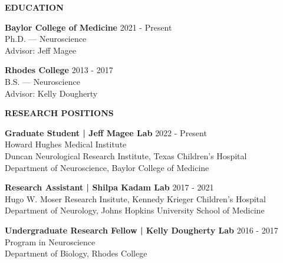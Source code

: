 \documentclass{resume} %
\begin{document}
\begin{rSection}{{\bfseries EDUCATION}}
 
    {\bfseries Baylor College of Medicine} \hfill { 2021 - Present }
    \\ Ph.D. — Neuroscience
    \\ Advisor: Jeff Magee \vspace{0.3\baselineskip}
    
    {\bfseries Rhodes College} \hfill { 2013 - 2017  }
    \\ B.S. — Neuroscience
    \\ Advisor: Kelly Dougherty 
    \end{rSection}


\begin{rSection}{{\bfseries RESEARCH POSITIONS}}
    
    {\bfseries Graduate Student | Jeff Magee Lab} \hfill {2022 - Present}
    \\ Howard Hughes Medical Institute
    \\ Duncan Neurological Research Institute, Texas Children's Hospital 
    \\ Department of Neuroscience, Baylor College of Medicine \vspace{0.3\baselineskip}

    {\bfseries Research Assistant | Shilpa Kadam Lab} \hfill {2017 - 2021} 
    \\ Hugo W. Moser Research Insitute, Kennedy Krieger Children's Hospital
    \\ Department of Neurology, Johns Hopkins University School of Medicine \vspace{0.3\baselineskip}

    {\bfseries Undergraduate Research Fellow | Kelly Dougherty Lab} \hfill {2016 - 2017} 
    \\ Program in Neuroscience
    \\ Department of Biology, Rhodes College  \vspace{0.3\baselineskip}
\end{rSection}
\end{document}
